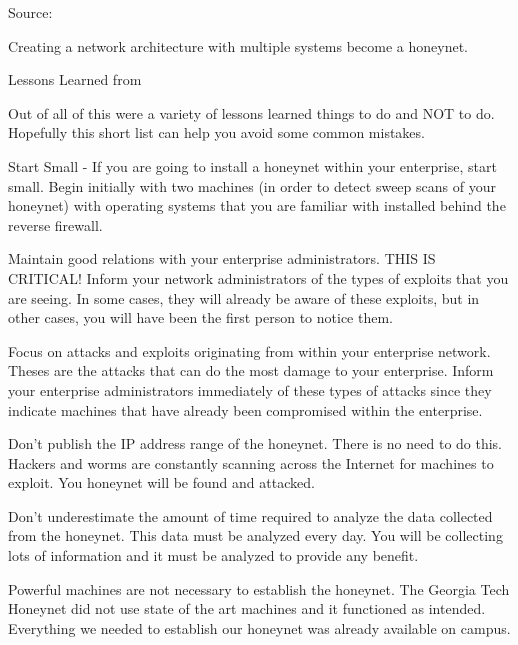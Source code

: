 \documentclass[Screen16to9,17pt]{foils}
\begin{document}
Source:



Creating a network architecture with multiple systems become a honeynet.

\begin{list2}
\item Lessons Learned from 
\item Out of all of this were a variety of lessons learned things to do and NOT to do. Hopefully this short list can help you avoid some common mistakes.
\end{list2}

\begin{list2}
\item Start Small - If you are going to install a honeynet within your enterprise, start small. Begin initially with two machines (in order to detect sweep scans of your honeynet) with operating systems that you are familiar with installed behind the reverse firewall.
\item Maintain good relations with your enterprise administrators. THIS IS CRITICAL! Inform your network administrators of the types of exploits that you are seeing. In some cases, they will already be aware of these exploits, but in other cases, you will have been the first person to notice them.
\end{list2}

\begin{list2}
\item Focus on attacks and exploits originating from within your enterprise network. Theses are the attacks that can do the most damage to your enterprise. Inform your enterprise administrators immediately of these types of attacks since they indicate machines that have already been compromised within the enterprise.
\item Don't publish the IP address range of the honeynet. There is no need to do this. Hackers and worms are constantly scanning across the Internet for machines to exploit. You honeynet will be found and attacked.
\item Don't underestimate the amount of time required to analyze the data collected from the honeynet. This data must be analyzed every day. You will be collecting lots of information and it must be analyzed to provide any benefit.
\item Powerful machines are not necessary to establish the honeynet. The Georgia Tech Honeynet did not use state of the art machines and it functioned as intended. Everything we needed to establish our honeynet was already available on campus.
\end{list2}
\end{document}
